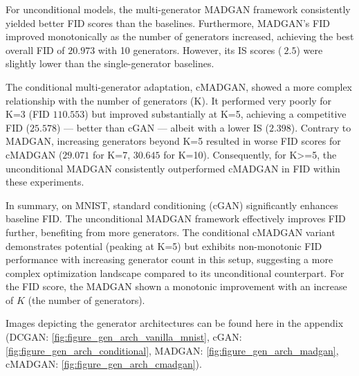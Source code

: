 For unconditional models, the multi-generator MADGAN framework consistently yielded better FID scores than the baselines. Furthermore, MADGAN's FID improved monotonically as the number of generators increased, achieving the best overall FID of $20.973$ with 10 generators. However, its IS scores ($~2.5$) were slightly lower than the single-generator baselines.

The conditional multi-generator adaptation, cMADGAN, showed a more complex relationship with the number of generators (K). It performed very poorly for K=3 (FID $110.553$) but improved substantially at K=5, achieving a competitive FID ($25.578$) — better than cGAN — albeit with a lower IS ($2.398$). Contrary to MADGAN, increasing generators beyond K=5 resulted in worse FID scores for cMADGAN ($29.071$ for K=7, $30.645$ for K=10). Consequently, for K>=5, the unconditional MADGAN consistently outperformed cMADGAN in FID within these experiments.

In summary, on MNIST, standard conditioning (cGAN) significantly enhances baseline FID. The unconditional MADGAN framework effectively improves FID further, benefiting from more generators. The conditional cMADGAN variant demonstrates potential (peaking at K=5) but exhibits non-monotonic FID performance with increasing generator count in this setup, suggesting a more complex optimization landscape compared to its unconditional counterpart. For the FID score, the MADGAN shown a monotonic improvement with an increase of $K$ (the number of generators).


Images depicting the generator architectures can be found here in the appendix (DCGAN: \ref{fig:figure_gen_arch_vanilla_mnist}, cGAN: \ref{fig:figure_gen_arch_conditional}, MADGAN: \ref{fig:figure_gen_arch_madgan}, cMADGAN: \ref{fig:figure_gen_arch_cmadgan}).


